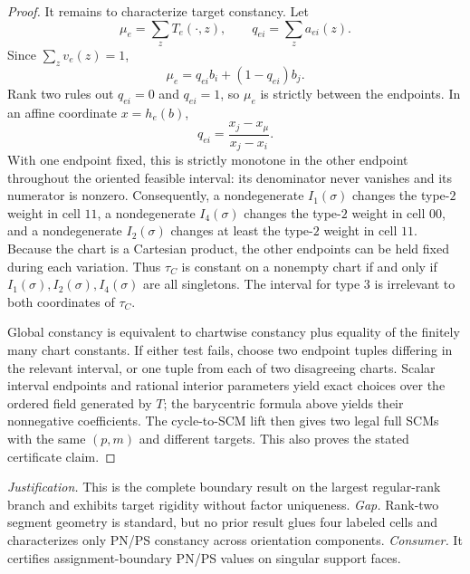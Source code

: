 \documentclass{article}
\begin{document}
\begin{proof}
It remains to characterize target constancy.  Let
\[
\mu_e=\sum_zT_e(\cdot,z),
\qquad
q_{ei}=\sum_z a_{ei}(z).
\]
Since \(\sum_zv_e(z)=1\),
\[
\mu_e=q_{ei}b_i+(1-q_{ei})b_j.
\]
Rank two rules out \(q_{ei}=0\) and \(q_{ei}=1\), so \(\mu_e\) is strictly between the endpoints.  In an affine coordinate \(x=h_e(b)\),
\[
q_{ei}=\frac{x_j-x_{\mu}}{x_j-x_i}.
\]
With one endpoint fixed, this is strictly monotone in the other endpoint throughout the oriented feasible interval: its denominator never vanishes and its numerator is nonzero.  Consequently, a nondegenerate \(I_1(\sigma)\) changes the type-\(2\) weight in cell \(11\), a nondegenerate \(I_4(\sigma)\) changes the type-\(2\) weight in cell \(00\), and a nondegenerate \(I_2(\sigma)\) changes at least the type-\(2\) weight in cell \(11\).  Because the chart is a Cartesian product, the other endpoints can be held fixed during each variation.  Thus \(\tau_C\) is constant on a nonempty chart if and only if \(I_1(\sigma),I_2(\sigma),I_4(\sigma)\) are all singletons.  The interval for type \(3\) is irrelevant to both coordinates of \(\tau_C\).

Global constancy is equivalent to chartwise constancy plus equality of the finitely many chart constants.  If either test fails, choose two endpoint tuples differing in the relevant interval, or one tuple from each of two disagreeing charts.  Scalar interval endpoints and rational interior parameters yield exact choices over the ordered field generated by \(T\); the barycentric formula above yields their nonnegative coefficients.  The cycle-to-SCM lift then gives two legal full SCMs with the same \((p,m)\) and different targets.  This also proves the stated certificate claim.
\end{proof}
\par\smallskip\noindent \textit{Justification.} This is the complete boundary result on the largest regular-rank branch and exhibits target rigidity without factor uniqueness. \textit{Gap.} Rank-two segment geometry is standard, but no prior result glues four labeled cells and characterizes only PN/PS constancy across orientation components. \textit{Consumer.} It certifies assignment-boundary PN/PS values on singular support faces.
\end{document}
